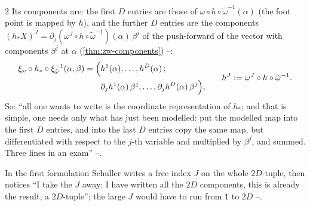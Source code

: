 \begin{paracol}{2}
Its components are: the first $D$ entries are those of $\omega\circ h\circ\tilde\omega^{-1}(\alpha)$ (the foot point is mapped by $h$), and the further $D$ entries are the components $(h_*X)^J=\partial_j(\omega^J\circ h\circ\tilde\omega^{-1})(\alpha)\,\beta^j$ of the push-forward of the vector with components $\beta^j$ at $\alpha$ (\cref{thm:zw-components}) --:
\begin{equation}\label{eq:pc-pushchart}
  \begin{aligned}\xi_\omega\circ h_*\circ\xi_{\tilde\omega}^{-1}(\alpha,\beta)=\Bigl(&h^1(\alpha),\dots,h^{D}(\alpha)\,;\\
  &\partial_jh^{1}(\alpha)\,\beta^j,\dots,\partial_jh^{D}(\alpha)\,\beta^j\Bigr),\end{aligned}
  \qquad h^J:=\omega^J\circ h\circ\tilde\omega^{-1}.
\end{equation}
So: ``all one wants to write is the coordinate representation of $h_*$; and that is simple, one needs only what has just been modelled: put the modelled map into the first $D$ entries, and into the last $D$ entries copy the same map, but differentiated with respect to the $j$-th variable and multiplied by $\beta^j$, and summed. Three lines in an exam'' --.

\begin{coursenote}\label{cn:pc-J}
In the first formulation Schuller writes a free index $J$ on the whole $2D$-tuple, then notices ``I take the $J$ away: I have written all the $2D$ components, this is already the result, a $2D$-tuple''; the large $J$ would have to run from $1$ to $2D$ --.
\end{coursenote}


\end{paracol}
